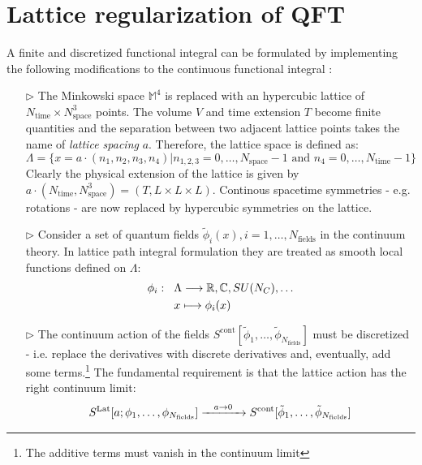 \documentclass[english, LaM, oneside, noexaminfo]{sapthesis}
\begin{document}
\section{Lattice regularization of QFT}\label{sec:lattice-discretization}
\noindent
A finite and discretized functional integral can be formulated by implementing the following modifications to the continuous functional integral \cite{montvay-munster}\cite{gattringer-lang}:
\begin{itemize}
    \item [$\triangleright$] The Minkowski space $\mathbb{M}^4$ is replaced with an hypercubic lattice of $N_\text{time} \times N_\text{space}^3$ points.
        The volume $V$ and time extension $T$ become finite quantities and the separation between two adjacent lattice points takes the name of \textit{lattice spacing} $a$.
        Therefore, the lattice space is defined as:
        \begin{equation*}
            \Lambda = \{x = a\cdot(n_1,n_2,n_3,n_4) | n_{1,2,3} = 0,\dots,N_\text{space}-1 \text{ and } n_4 = 0,\dots,N_\text{time}-1 \}
        \end{equation*}
        Clearly the physical extension of the lattice is given by $a\cdot(N_\text{time},N_\text{space}^3) = (T,L\times L\times L)$.
        Continous spacetime symmetries - e.g. rotations - are now replaced by hypercubic symmetries on the lattice.
    \item [$\triangleright$] Consider a set of quantum fields $\tilde\phi_i(x), i = 1,\dots, N_\text{fields}$ in the continuum theory.
        In lattice path integral formulation they are treated as smooth local functions defined on $\Lambda$:
        \begin{equation*}
            \begin{aligned}
                \phi_i : \hspace*{3mm}
                & \Lambda \longrightarrow \mathbb{R}, \mathbb{C}, SU(N_C), \dots \\
                & x \longmapsto \phi_i (x)
            \end{aligned}
        \end{equation*}
    \item [$\triangleright$] The continuum action of the fields $S^\text{cont}[\tilde\phi_1,\dots,\tilde\phi_{N_\text{fields}}]$ must be discretized - i.e. replace the derivatives with discrete derivatives and, eventually, add some terms.\footnote{The additive terms must vanish in the continuum limit}
        The fundamental requirement is that the lattice action has the right continuum limit: $$S^\text{Lat}[a;\phi_1,\dots,\phi_{N_\text{fields}}] \xrightarrow{\hspace*{3mm} a \rightarrow 0\hspace*{3mm}} S^\text{cont}[\tilde\phi_1,\dots,\tilde\phi_{N_\text{fields}}]$$

\end{itemize}
\end{document}
